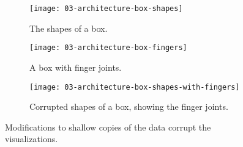\documentclass[../../ClassicThesis.tex]{subfiles}
\begin{document}
\begin{figure}[h]
  \centering
  \begin{subfigure}[t]{0.3222\textwidth}
    \texttt{[image: 03-architecture-box-shapes]}
    \caption{The shapes of a box.}
    \label{fig:corrupt:shapes}
  \end{subfigure}
  \begin{subfigure}[t]{0.3222\textwidth}
    \texttt{[image: 03-architecture-box-fingers]}
    \caption{A box with finger joints.}
    \label{fig:corrupt:fingers}
  \end{subfigure}
  \begin{subfigure}[t]{0.3222\textwidth}
    \texttt{[image: 03-architecture-box-shapes-with-fingers]}
    \caption{Corrupted shapes of a box, showing the finger joints.}
    \label{fig:corrupt:shapes-fingers}
  \end{subfigure}
  \caption{Modifications to shallow copies of the data
    corrupt the visualizations.}
  \label{fig:corrupt}
\end{figure}




\end{document}
